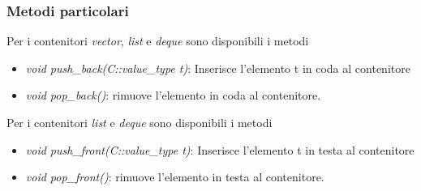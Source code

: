 \subsubsection{Metodi particolari}

Per i contenitori \textit{vector}, \textit{list} e \textit{deque} sono disponibili i metodi

\begin{itemize}
	\item \textit{void push\_back(C::value\_type t)}: Inserisce l'elemento t in coda al contenitore
	\item \textit{void pop\_back()}: rimuove l'elemento in coda al contenitore.
\end{itemize}

Per i contenitori \textit{list} e \textit{deque} sono disponibili i metodi

\begin{itemize}
	\item \textit{void push\_front(C::value\_type t)}: Inserisce l'elemento t in testa al contenitore
	\item \textit{void pop\_front()}: rimuove l'elemento in testa al contenitore.
\end{itemize}
